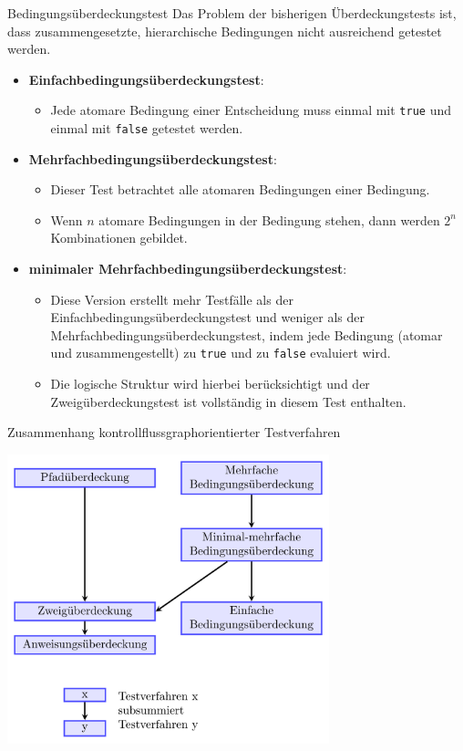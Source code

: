 \begin{defi}{Bedingungsüberdeckungstest}
    Das Problem der bisherigen Überdeckungstests ist, dass zusammengesetzte, hierarchische Bedingungen nicht ausreichend getestet werden.

    \begin{itemize}
        \item \textbf{Einfachbedingungsüberdeckungstest}:
              \begin{itemize}
                  \item Jede atomare Bedingung einer Entscheidung muss einmal mit \texttt{true} und einmal mit \texttt{false} getestet werden.
              \end{itemize}
        \item \textbf{Mehrfachbedingungsüberdeckungstest}:
              \begin{itemize}
                  \item Dieser Test betrachtet alle atomaren Bedingungen einer Bedingung.
                  \item Wenn $n$ atomare Bedingungen in der Bedingung stehen, dann werden $2^{n}$ Kombinationen gebildet.
              \end{itemize}
        \item \textbf{minimaler Mehrfachbedingungsüberdeckungstest}:
              \begin{itemize}
                  \item Diese Version erstellt mehr Testfälle als der Einfachbedingungsüberdeckungstest und weniger als der Mehrfachbedingungsüberdeckungstest, indem jede Bedingung (atomar und zusammengestellt) zu \texttt{true} und zu \texttt{false} evaluiert wird.
                  \item Die logische Struktur wird hierbei berücksichtigt und der Zweigüberdeckungstest ist vollständig in diesem Test enthalten.
              \end{itemize}
    \end{itemize}
\end{defi}

\begin{bonus}{Zusammenhang kontrollflussgraphorientierter Testverfahren}
    \begin{center}
        \includegraphics[width=0.7\textwidth]{includes/figures/bonus_kontrollfluss_test.png}
    \end{center}
\end{bonus}

